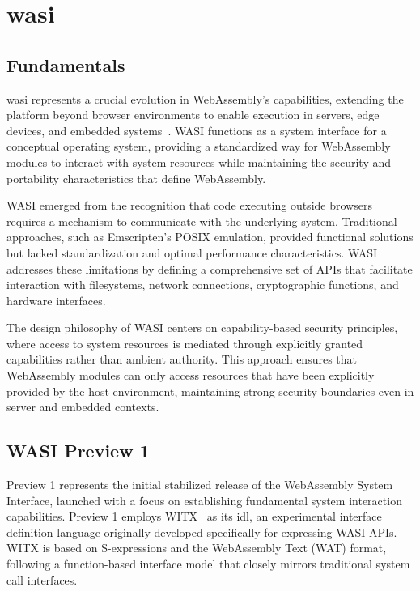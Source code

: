 \section{\acrfull{wasi}}
\label{sec:wasi}

\subsection{Fundamentals}
\label{subsec:wasi-fundamentals}

\acrshort{wasi} represents a crucial evolution in WebAssembly's capabilities, extending the platform beyond browser environments to enable execution in servers, edge devices, and embedded systems~\cite{wasi_mozilla_blog}. WASI functions as a system interface for a conceptual operating system, providing a standardized way for WebAssembly modules to interact with system resources while maintaining the security and portability characteristics that define WebAssembly.

WASI emerged from the recognition that code executing outside browsers requires a mechanism to communicate with the underlying system. Traditional approaches, such as Emscripten's POSIX emulation, provided functional solutions but lacked standardization and optimal performance characteristics. WASI addresses these limitations by defining a comprehensive set of APIs that facilitate interaction with filesystems, network connections, cryptographic functions, and hardware interfaces.

The design philosophy of WASI centers on capability-based security principles, where access to system resources is mediated through explicitly granted capabilities rather than ambient authority. This approach ensures that WebAssembly modules can only access resources that have been explicitly provided by the host environment, maintaining strong security boundaries even in server and embedded contexts.

\subsection{WASI Preview 1}
\label{subsec:wasi-preview1}
Preview 1 represents the initial stabilized release of the WebAssembly System Interface, launched with a focus on establishing fundamental system interaction capabilities. Preview 1 employs WITX~\cite{witx_docs} as its \acrfull{idl}, an experimental interface definition language originally developed specifically for expressing WASI APIs. WITX is based on S-expressions and the WebAssembly Text (WAT) format, following a function-based interface model that closely mirrors traditional system call interfaces.

